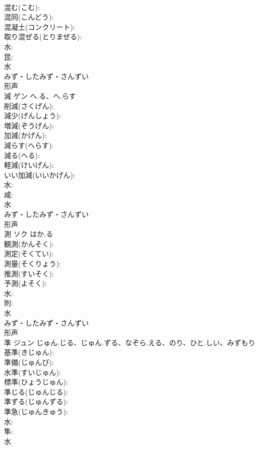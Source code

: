 \documentclass[8pt]{extreport}
\begin{document}
\begin{CJK}{UTF8}{min}
\\	混む(こむ): 
\\	混同(こんどう): 
\\	混凝土(コンクリート): 
\\	取り混ぜる(とりまぜる): 
\\	水: 
\\	昆: 
\\	水	
\\	みず・したみず・さんずい	
\\	形声 
\\	減	ゲン	へ.る、へ.らす		
\\	削減(さくげん): 
\\	減少(げんしょう): 
\\	増減(ぞうげん): 
\\	加減(かげん): 
\\	減らす(へらす): 
\\	減る(へる): 
\\	軽減(けいげん): 
\\	いい加減(いいかげん): 
\\	水: 
\\	咸: 
\\	水	
\\	みず・したみず・さんずい	
\\	形声 
\\	測	ソク	はか.る		
\\	観測(かんそく): 
\\	測定(そくてい): 
\\	測量(そくりょう): 
\\	推測(すいそく): 
\\	予測(よそく): 
\\	水: 
\\	則: 
\\	水	
\\	みず・したみず・さんずい	
\\	形声 
\\	準	ジュン	じゅん.じる、じゅん.ずる、なぞら.える、のり、ひと.しい、みずもり		
\\	基準(きじゅん): 
\\	準備(じゅんび): 
\\	水準(すいじゅん): 
\\	標準(ひょうじゅん): 
\\	準じる(じゅんじる): 
\\	準ずる(じゅんずる): 
\\	準急(じゅんきゅう): 
\\	水: 
\\	隼: 
\\	水	

\end{CJK}
\end{document}
